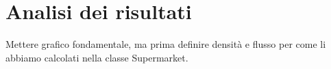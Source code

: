 \chapter{Analisi dei risultati}

Mettere grafico fondamentale, ma prima definire densità e flusso per come li abbiamo calcolati nella classe Supermarket.